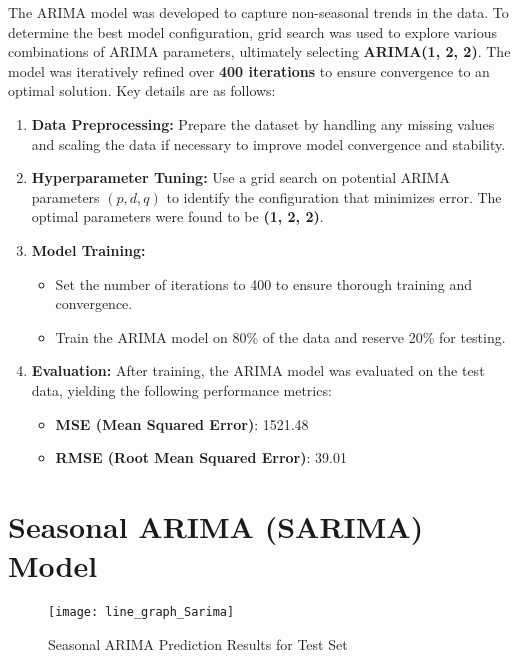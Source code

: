 The ARIMA model was developed to capture non-seasonal trends in the data. To determine the best model configuration, grid search was used to explore various combinations of ARIMA parameters, ultimately selecting \textbf{ARIMA(1, 2, 2)}. The model was iteratively refined over \textbf{400 iterations} to ensure convergence to an optimal solution. Key details are as follows:

\begin{enumerate}
	\item \textbf{Data Preprocessing:}  
	Prepare the dataset by handling any missing values and scaling the data if necessary to improve model convergence and stability.
	
	\item \textbf{Hyperparameter Tuning:}  
	Use a grid search on potential ARIMA parameters $(p, d, q)$ to identify the configuration that minimizes error. The optimal parameters were found to be \textbf{(1, 2, 2)}.
	
	\item \textbf{Model Training:}
	\begin{itemize}
		\item Set the number of iterations to 400 to ensure thorough training and convergence.
		\item Train the ARIMA model on 80\% of the data and reserve 20\% for testing.
	\end{itemize}
	
	\item \textbf{Evaluation:}  
	After training, the ARIMA model was evaluated on the test data, yielding the following performance metrics:
	\begin{itemize}
		\item \textbf{MSE (Mean Squared Error)}: 1521.48
		\item \textbf{RMSE (Root Mean Squared Error)}: 39.01
	\end{itemize}
\end{enumerate}


\section*{Seasonal ARIMA (SARIMA) Model}

\begin{figure}[H]
	\centering
	\texttt{[image: line\_graph\_Sarima]}
	\caption{Seasonal ARIMA Prediction Results for Test Set}
	\label{fig:Sarima_result}
\end{figure}


